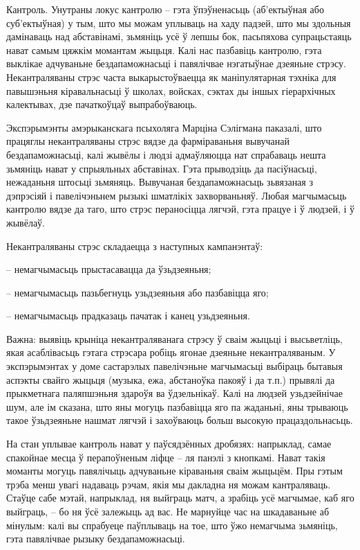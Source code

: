 Кантроль. Унутраны локус кантролю – гэта ўпэўненасьць (аб'ектыўная або суб'ектыўная) у тым, што мы можам уплываць на хаду падзей, што мы здольныя дамінаваць над абставінамі, зьмяніць усё ў лепшы бок, пасьпяхова супрацьстаяць нават самым цяжкім момантам жыцьця. Калі нас пазбавіць кантролю, гэта выклікае адчуваньне бездапаможнасьці і павялічвае нэгатыўнае дзеяньне стрэсу. Некантраляваны стрэс часта выкарыстоўваецца як маніпулятарная тэхніка для павышэньня кіравальнасьці ў школах, войсках, сэктах ды іншых гіерархічных калектывах, дзе пачаткоўцаў выпрабоўваюць.

Экспэрымэнты амэрыканскага псыхоляга Марціна Сэлігмана паказалі, што працяглы некантраляваны стрэс вядзе да фарміраваньня вывучанай бездапаможнасьці, калі жывёлы і людзі адмаўляюцца нат спрабаваць нешта зьмяніць нават у спрыяльных абставінах. Гэта прыводзіць да пасіўнасьці, нежаданьня штосьці зьмяняць. Вывучаная бездапаможнасьць зьвязаная з дэпрэсіяй і павелічэньнем рызыкі шматлікіх захворваньняў. Любая магчымасьць кантролю вядзе да таго, што стрэс пераносіцца лягчэй, гэта працуе і ў людзей, і ў жывёлаў.

Некантраляваны стрэс складаецца з наступных кампанэнтаў: 

– немагчымасьць прыстасавацца да ўзьдзеяньня;

– немагчымасьць пазьбегнуць узьдзеяньня або пазбавіцца яго;

– немагчымасьць прадказаць пачатак і канец узьдзеяньня.

Важна: выявіць крыніца некантраляванага стрэсу ў сваім жыцьці і высьветліць, якая асаблівасьць гэтага стрэсара робіць ягонае дзеяньне некантраляваным. У экспэрымэнтах у доме састарэлых павелічэньне магчымасьці выбіраць бытавыя аспэкты свайго жыцьця (музыка, ежа, абстаноўка пакояў і да т.п.) прывялі да прыкметнага паляпшэньня здароўя ва ўдзельнікаў. Калі на людзей узьдзейнічае шум, але ім сказана, што яны могуць пазбавіцца яго па жаданьні, яны трываюць такое ўзьдзеяньне нашмат лягчэй і захоўваюць больш высокую працаздольнасьць. 

На стан уплывае кантроль нават у паўсядзённых дробязях: напрыклад, самае спакойнае месца ў перапоўненым ліфце – ля панэлі з кнопкамі. Нават такія моманты могуць павялічыць адчуваньне кіраваньня сваім жыцьцём. Пры гэтым трэба менш увагі надаваць рэчам, якія мы дакладна ня можам кантраляваць. Стаўце сабе мэтай, напрыклад, ня выйграць матч, а зрабіць усё магчымае, каб яго выйграць, – бо ня ўсё залежыць ад вас. Не марнуйце час на шкадаваньне аб мінулым: калі вы спрабуеце паўплываць на тое, што ўжо немагчыма зьмяніць, гэта павялічвае рызыку бездапаможнасьці.

